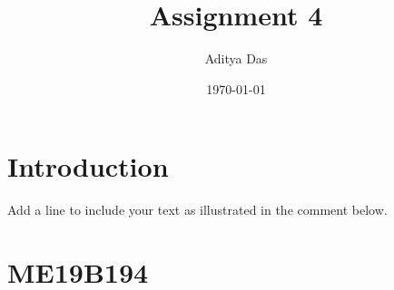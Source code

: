 \documentclass[a4paper, 12pt]{article}
\begin{document}
\title{Assignment 4}
\author{Aditya Das}
\date{\today}
\maketitle

\tableofcontents

\section{Introduction}
Add a line to include your text as illustrated in the comment below.
\section{ME19B194}

\end{document}
